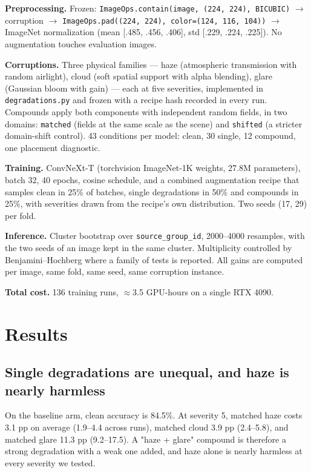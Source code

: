 \textbf{Preprocessing.} Frozen: \texttt{ImageOps.contain(image, (224, 224), BICUBIC)} $\to$ corruption $\to$ \texttt{ImageOps.pad((224, 224), color=(124, 116, 104))} $\to$ ImageNet normalization (mean [.485, .456, .406], std [.229, .224, .225]). No augmentation touches evaluation images.

\textbf{Corruptions.} Three physical families --- haze (atmospheric transmission with random airlight), cloud (soft spatial support with alpha blending), glare (Gaussian bloom with gain) --- each at five severities, implemented in \texttt{degradations.py} and frozen with a recipe hash recorded in every run. Compounds apply both components with independent random fields, in two domains: \texttt{matched} (fields at the same scale as the scene) and \texttt{shifted} (a stricter domain-shift control). 43 conditions per model: clean, 30 single, 12 compound, one placement diagnostic.

\textbf{Training.} ConvNeXt-T \cite{liu2022convnext} (torchvision ImageNet-1K weights, 27.8M parameters), batch 32, 40 epochs, cosine schedule, and a combined augmentation recipe that samples clean in 25\% of batches, single degradations in 50\% and compounds in 25\%, with severities drawn from the recipe's own distribution. Two seeds (17, 29) per fold.

\textbf{Inference.} Cluster bootstrap over \texttt{source\_group\_id}, 2000--4000 resamples, with the two seeds of an image kept in the same cluster. Multiplicity controlled by Benjamini--Hochberg where a family of tests is reported. All gains are computed per image, same fold, same seed, same corruption instance.

\textbf{Total cost.} 136 training runs, $\approx$3.5 GPU-hours on a single RTX 4090.

\section{Results}
\subsection{Single degradations are unequal, and haze is nearly harmless}
On the baseline arm, clean accuracy is 84.5\%. At severity 5, matched haze costs 3.1 pp on average (1.9--4.4 across runs), matched cloud 3.9 pp (2.4--5.8), and matched glare 11.3 pp (9.2--17.5). A "haze + glare" compound is therefore a strong degradation with a weak one added, and haze alone is nearly harmless at every severity we tested.

